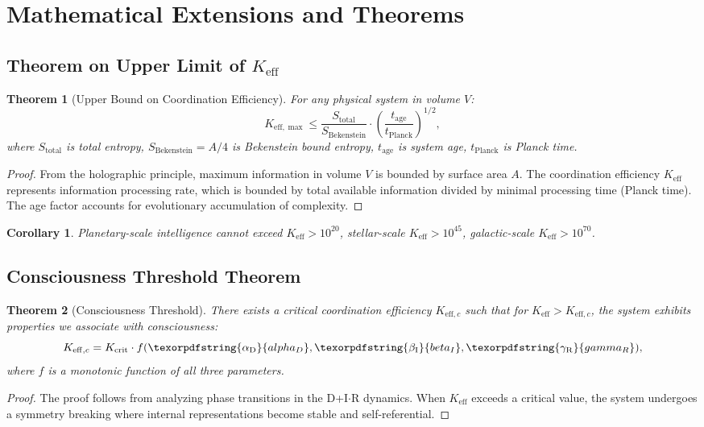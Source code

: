 \documentclass[12pt,a4paper]{article}
\newtheorem{theorem}{Theorem}
\newtheorem{corollary}{Corollary}
\DeclareRobustCommand{\alD}{\texorpdfstring{\ensuremath{\alpha_{\mathrm{D}}}}{alpha_D}}
\DeclareRobustCommand{\beI}{\texorpdfstring{\ensuremath{\beta_{\mathrm{I}}}}{beta_I}}
\DeclareRobustCommand{\gaR}{\texorpdfstring{\ensuremath{\gamma_{\mathrm{R}}}}{gamma_R}}
\newcommand{\eff}{\mathrm{eff}}
\newcommand{\Ke}{K_{\eff}}
\newcommand{\Kemax}{K_{\eff,\max}}
\newcommand{\Kec}{K_{\eff,c}}
\newcommand{\Kcrit}{K_{\mathrm{crit}}}
\begin{document}
	\section{Mathematical Extensions and Theorems}
	
	\subsection{Theorem on Upper Limit of \(\Ke\)}
	
	\begin{theorem}[Upper Bound on Coordination Efficiency]
		For any physical system in volume \(V\):
		\[
		\Kemax \leq \frac{S_{\mathrm{total}}}{S_{\mathrm{Bekenstein}}} \cdot \left(\frac{t_{\mathrm{age}}}{t_{\mathrm{Planck}}}\right)^{1/2},
		\]
		where \(S_{\mathrm{total}}\) is total entropy, \(S_{\mathrm{Bekenstein}} = A/4\) is Bekenstein bound entropy, \(t_{\mathrm{age}}\) is system age, \(t_{\mathrm{Planck}}\) is Planck time.
	\end{theorem}
	
	\begin{proof}
		From the holographic principle, maximum information in volume \(V\) is bounded by surface area \(A\). The coordination efficiency \(\Ke\) represents information processing rate, which is bounded by total available information divided by minimal processing time (Planck time). The age factor accounts for evolutionary accumulation of complexity.
	\end{proof}
	
	\begin{corollary}
		Planetary-scale intelligence cannot exceed \(\Ke > 10^{20}\), stellar-scale \(\Ke > 10^{45}\), galactic-scale \(\Ke > 10^{70}\).
	\end{corollary}
	
	\subsection{Consciousness Threshold Theorem}
	
	\begin{theorem}[Consciousness Threshold]
		There exists a critical coordination efficiency \(K_{\eff,c}\) such that for \(\Ke > K_{\eff,c}\), the system exhibits properties we associate with consciousness:
		\[
		\Kec = \Kcrit \cdot f(\alD, \beI, \gaR),
		\]
		where \(f\) is a monotonic function of all three parameters.
	\end{theorem}
	
	\begin{proof}
		The proof follows from analyzing phase transitions in the D+I\(\cdot\)R dynamics. When \(\Ke\) exceeds a critical value, the system undergoes a symmetry breaking where internal representations become stable and self-referential.
	\end{proof}
	
\end{document}
